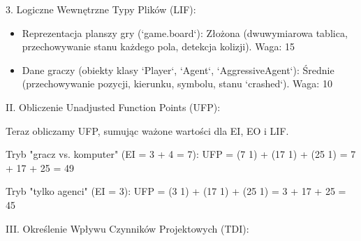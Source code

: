 \documentclass[12pt,a4paper]{article}
\begin{document}
3. Logiczne Wewnętrzne Typy Plików (LIF):
\begin{itemize}
    \item Reprezentacja planszy gry (`game.board`): Złożona (dwuwymiarowa tablica, przechowywanie stanu każdego pola, detekcja kolizji). Waga: 15
    \item Dane graczy (obiekty klasy `Player`, `Agent`, `AggressiveAgent`): Średnie (przechowywanie pozycji, kierunku, symbolu, stanu `crashed`). Waga: 10
\end{itemize} 

II. Obliczenie Unadjusted Function Points (UFP):

Teraz obliczamy UFP, sumując ważone wartości dla EI, EO i LIF.

Tryb "gracz vs. komputer" (EI = 3 + 4 = 7):
UFP = (7  1) + (17  1) + (25  1) = 7 + 17 + 25 = 49

Tryb "tylko agenci" (EI = 3):
UFP = (3  1) + (17  1) + (25  1) = 3 + 17 + 25 = 45

III. Określenie Wpływu Czynników Projektowych (TDI):
\end{document}

